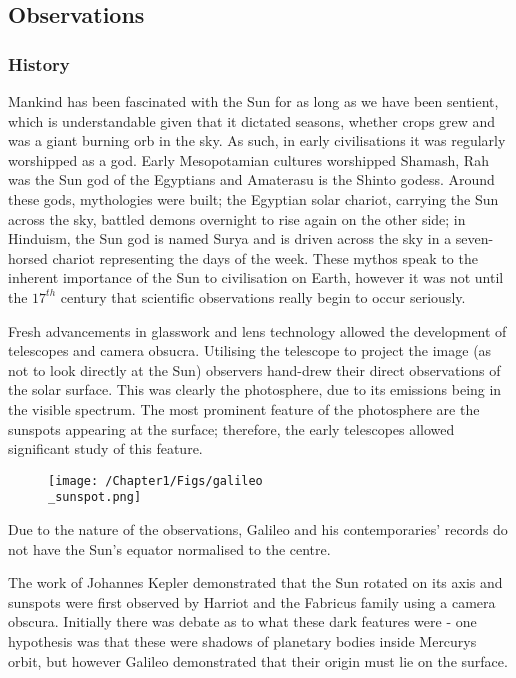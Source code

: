 \subsection{Observations}

\subsubsection{History}
Mankind has been fascinated with the Sun for as long as we have been sentient, which is understandable given that it dictated seasons, whether crops grew and was a giant burning orb in the sky.
As such, in early civilisations it was regularly worshipped as a god.
Early Mesopotamian cultures worshipped Shamash, Rah was the Sun god of the Egyptians and Amaterasu is the Shinto godess.
Around these gods, mythologies were built; the Egyptian solar chariot, carrying the Sun across the sky, battled demons overnight to rise again on the other side; in Hinduism, the Sun god is named Surya and is driven across the sky in a seven-horsed chariot representing the days of the week.
These mythos speak to the inherent importance of the Sun to civilisation on Earth, however it was not until the $17^{th}$ century that scientific observations really begin to occur seriously.


Fresh advancements in glasswork and lens technology allowed the development of telescopes and camera obsucra.
Utilising the telescope to project the image (as not to look directly at the Sun) observers hand-drew their direct observations of the solar surface.
This was clearly the photosphere, due to its emissions being in the visible spectrum. 
The most prominent feature of the photosphere are the sunspots appearing at the surface; therefore, the early telescopes allowed significant study of this feature.

\begin{figure}
	\texttt{[image: /Chapter1/Figs/galileo\\\_sunspot.png]}
	\label{fig:gali_sp}
\end{figure}

Due to the nature of the observations, Galileo and his contemporaries' records do not have the Sun's equator normalised to the centre. 

The work of Johannes Kepler demonstrated that the Sun rotated on its axis and sunspots were first observed by Harriot and the Fabricus family using a camera obscura. 
Initially there was debate as to what these dark features were - one hypothesis was that these were shadows of planetary bodies inside Mercurys orbit, but however Galileo demonstrated that their origin must lie on the surface.

